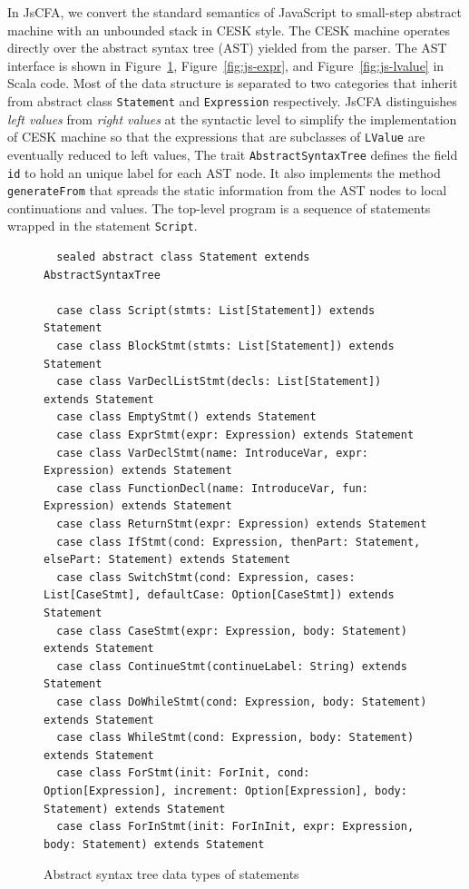\documentclass[12pt]{report}
\begin{document}
In JsCFA, we convert the standard semantics of JavaScript to small-step abstract machine with an unbounded stack in CESK style.
The CESK machine operates directly over the abstract syntax tree (AST) yielded from the parser.
The AST interface is shown in Figure~\ref{fig:js-stmt}, Figure~\ref{fig:js-expr}, and Figure~\ref{fig:js-lvalue}  in Scala code.
Most of the data structure is separated to two categories that inherit from abstract class \verb|Statement| and \verb|Expression| respectively.
JsCFA distinguishes \emph{left values} from \emph{right values} at the syntactic level to simplify the implementation of CESK machine so that the expressions that are subclasses of \verb|LValue| are eventually reduced to left values,
The trait \verb|AbstractSyntaxTree| defines the field \verb|id| to hold an unique label for each AST node.
It also implements the method \verb|generateFrom| that spreads the static information from the AST nodes to
local continuations and values.
The top-level program is a sequence of statements wrapped in the statement \verb|Script|.

\begin{figure}
{}
\begin{lstlisting}
  sealed abstract class Statement extends AbstractSyntaxTree

  case class Script(stmts: List[Statement]) extends  Statement
  case class BlockStmt(stmts: List[Statement]) extends Statement
  case class VarDeclListStmt(decls: List[Statement]) extends Statement
  case class EmptyStmt() extends Statement
  case class ExprStmt(expr: Expression) extends Statement
  case class VarDeclStmt(name: IntroduceVar, expr: Expression) extends Statement
  case class FunctionDecl(name: IntroduceVar, fun: Expression) extends Statement
  case class ReturnStmt(expr: Expression) extends Statement
  case class IfStmt(cond: Expression, thenPart: Statement, elsePart: Statement) extends Statement
  case class SwitchStmt(cond: Expression, cases: List[CaseStmt], defaultCase: Option[CaseStmt]) extends Statement
  case class CaseStmt(expr: Expression, body: Statement) extends Statement
  case class ContinueStmt(continueLabel: String) extends Statement
  case class DoWhileStmt(cond: Expression, body: Statement) extends Statement
  case class WhileStmt(cond: Expression, body: Statement) extends Statement
  case class ForStmt(init: ForInit, cond: Option[Expression], increment: Option[Expression], body: Statement) extends Statement
  case class ForInStmt(init: ForInInit, expr: Expression, body: Statement) extends Statement

\end{lstlisting}
\caption{Abstract syntax tree data types of statements}
\label{fig:js-stmt}
\end{figure}
\end{document}
